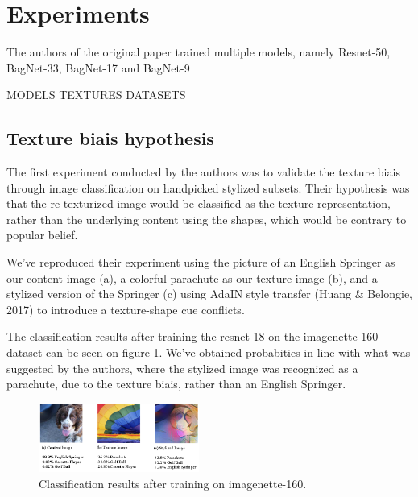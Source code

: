 \documentclass{article}
\begin{document}
\newpage
\section{Experiments}

The authors of the original paper trained multiple models, 
namely Resnet-50, BagNet-33, BagNet-17 and BagNet-9

MODELS
TEXTURES
DATASETS



\subsection{Texture biais hypothesis}

The first experiment conducted by the authors was to validate the texture biais 
through image classification on handpicked stylized subsets. 
Their hypothesis was that the re-texturized image would be classified as the texture representation, rather than 
the underlying content using the shapes, which would be contrary to popular belief. \smallskip

\noindent
We've reproduced their experiment using the picture of an English Springer as our content image (a), 
a colorful parachute as our texture image (b),
and a stylized version of the Springer (c) using AdaIN style transfer 
(Huang \& Belongie, 2017) %
to introduce a texture-shape cue conflicts. \smallskip

\noindent
The classification results after training the resnet-18 on the imagenette-160 dataset can be seen on figure 1.
We've obtained probabities in line with what was suggested by the authors, 
where the stylized image was recognized as a parachute, 
due to the texture biais, rather than an English Springer.

\begin{figure}[h!]\center
  \includegraphics[width=0.47\textwidth]{imgs/results-textures}
  \caption{Classification results after training on imagenette-160.}
\end{figure}
\end{document}
